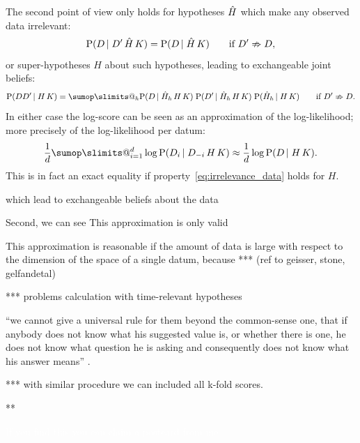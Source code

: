 \documentclass[\ifafour a4paper,12pt,\else a5paper,10pt,\fi%
onecolumn,oneside,article,%
british%
]{memoir}
\makeatletter
\theoremstyle{remark}
\theoremstyle{innote}
\def\sum{\DOTSI\sumop\slimits@}
\newcommand*{\citep}{\parencites}
\newcommand*{\p}{\mathrm{P}}%
\renewcommand*{\|}[1][]{\nonscript\,#1\vert\nonscript\;\mathopen{}}
\newcommand*{\sect}{\S}%
\newcommand*{\yK}{K}
\newcommand*{\hH}{\Hat{H}}
\makeatother
\begin{document}
The second point of view only holds for hypotheses $\hH$ which make any
observed data irrelevant:
\begin{equation}
  \label{eq:irrelevance_data}
  \p(D \| D' \, \hH \, \yK) = \p(D \| \hH \, \yK)
  \qquad\text{if $D' \nRightarrow D$},
\end{equation}
or super-hypotheses $H$ about such hypotheses, leading to exchangeable
joint beliefs:
\begin{equation}
  \label{eq:superhypothesis_irrelevance_data}
  \p(D D' \| H \, \yK) = \sum_{h} \p(D \| \hH_{h} \, H \, \yK)\;
  \p(D' \| \hH_{h} \, H \, \yK)\;
  \p(\hH_{h} \| H \, \yK)
  \qquad\text{if $D' \nRightarrow D$}.
\end{equation}
In either case the log-score can be seen as an approximation of the log-likelihood;
more precisely of the log-likelihood per datum:
\begin{equation}
  \label{eq:logscore_approx_loglh}
  \frac{1}{d} \sum_{i=1}^{d} \log\p(D_{i} \| D_{-i} \, H \, \yK)
  \approx \frac{1}{d} \log\p(D \| H \, \yK).
\end{equation}
This is in fact an exact equality if property~\eqref{eq:irrelevance_data}
holds for $H$.

which lead to
exchangeable beliefs about the data

Second, we can see 
This approximation is only valid

This approximation is reasonable if the amount of data is large with
respect to the dimension of the space of a single datum, because *** (ref
to geisser, stone, gelfandetal)

*** problems calculation with time-relevant hypotheses


\enquote{we cannot give a universal rule for them beyond the common-sense one, that if anybody does not know what his suggested value is, or whether there is one, he does not know what question he is asking and consequently does not know what his answer means} \citep[\sect~3.1 p.~124 ]{jeffreys1939_r1983}.


*** with similar procedure we can included all k-fold scores.


**



\textcolor{white}{If you find this you can claim a postcard from me.}






\end{document}
